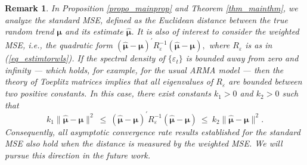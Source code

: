 \documentclass[11pt]{article}
\newtheorem{remark}[theorem]{Remark}
\numberwithin{equation}{section}
\numberwithin{figure}{section}
\begin{document}
\begin{remark}\label{rmk_tecnihcalwls}
In Proposition \ref{propo_mainprop} and Theorem \ref{thm_mainthm}, we analyze the standard MSE, defined as the Euclidean distance between the true random trend $\bm{\mu}$ and its estimate $\widehat{\bm{\mu}}$. 
It is also of interest to consider the \emph{weighted MSE}, i.e., the quadratic form \cite{carroll} 
$
(\widehat{\bm{\mu}}-\bm{\mu})^{\prime}R_{\varepsilon}^{-1}(\widehat{\bm{\mu}}-\bm{\mu}),
$
where $R_{\varepsilon}$ is as in (\ref{eq_estimtorwls}). 
If the spectral density of $\{\varepsilon_t\}$ is bounded away from zero and infinity — which holds, for example, for the usual ARMA model — then the theory of Toeplitz matrices \cite{grenander_szego_1958} implies that all eigenvalues of $R_{\varepsilon}$ are bounded between two positive constants. 
In this case, there exist constants $k_{1}>0$ and $k_{2}>0$ such that 
$$
k_{1}\|\widehat{\bm{\mu}}-\bm{\mu}\|^{2}
\ \leq\ 
(\widehat{\bm{\mu}}-\bm{\mu})^{\prime}R_{\varepsilon}^{-1}(\widehat{\bm{\mu}}-\bm{\mu})
\ \leq\ 
k_{2}\|\widehat{\bm{\mu}}-\bm{\mu}\|^{2}.
$$
Consequently, all asymptotic convergence rate results established for the standard MSE also hold when the distance is measured by the weighted MSE. We will pursue this direction in the future work.   
\end{remark}

%
%
%

\end{document}
